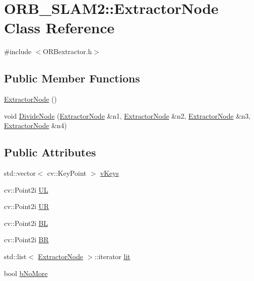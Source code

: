 \hypertarget{class_o_r_b___s_l_a_m2_1_1_extractor_node}{}\section{O\+R\+B\+\_\+\+S\+L\+A\+M2\+:\+:Extractor\+Node Class Reference}
\label{class_o_r_b___s_l_a_m2_1_1_extractor_node}


{\ttfamily \#include $<$O\+R\+Bextractor.\+h$>$}

\subsection*{Public Member Functions}
\begin{DoxyCompactItemize}
\item 
\mbox{\hyperlink{class_o_r_b___s_l_a_m2_1_1_extractor_node_af1920a7d5f8166debdd4a7fe4a15a8e9}{Extractor\+Node}} ()
\item 
void \mbox{\hyperlink{class_o_r_b___s_l_a_m2_1_1_extractor_node_ad560af26a7bab99551eab2e5c08f6535}{Divide\+Node}} (\mbox{\hyperlink{class_o_r_b___s_l_a_m2_1_1_extractor_node}{Extractor\+Node}} \&n1, \mbox{\hyperlink{class_o_r_b___s_l_a_m2_1_1_extractor_node}{Extractor\+Node}} \&n2, \mbox{\hyperlink{class_o_r_b___s_l_a_m2_1_1_extractor_node}{Extractor\+Node}} \&n3, \mbox{\hyperlink{class_o_r_b___s_l_a_m2_1_1_extractor_node}{Extractor\+Node}} \&n4)
\end{DoxyCompactItemize}
\subsection*{Public Attributes}
\begin{DoxyCompactItemize}
\item 
std\+::vector$<$ cv\+::\+Key\+Point $>$ \mbox{\hyperlink{class_o_r_b___s_l_a_m2_1_1_extractor_node_a34dda34415caa0e996148e53f8b174ce}{v\+Keys}}
\item 
cv\+::\+Point2i \mbox{\hyperlink{class_o_r_b___s_l_a_m2_1_1_extractor_node_a3f3ae5685a8a2b2cd42fbd08e7563c3d}{UL}}
\item 
cv\+::\+Point2i \mbox{\hyperlink{class_o_r_b___s_l_a_m2_1_1_extractor_node_a73ec9b10c8a3f98ed70a117086bae12a}{UR}}
\item 
cv\+::\+Point2i \mbox{\hyperlink{class_o_r_b___s_l_a_m2_1_1_extractor_node_ab31adc0d00b85307ba98b2ff434c30fc}{BL}}
\item 
cv\+::\+Point2i \mbox{\hyperlink{class_o_r_b___s_l_a_m2_1_1_extractor_node_a8530a1f5934122f24382859c156a441d}{BR}}
\item 
std\+::list$<$ \mbox{\hyperlink{class_o_r_b___s_l_a_m2_1_1_extractor_node}{Extractor\+Node}} $>$\+::iterator \mbox{\hyperlink{class_o_r_b___s_l_a_m2_1_1_extractor_node_a5301b76ea0e33bb066a46776810d742c}{lit}}
\item 
bool \mbox{\hyperlink{class_o_r_b___s_l_a_m2_1_1_extractor_node_ada60a6ca3a5874204dcb3245ac7d2d97}{b\+No\+More}}
\end{DoxyCompactItemize}



